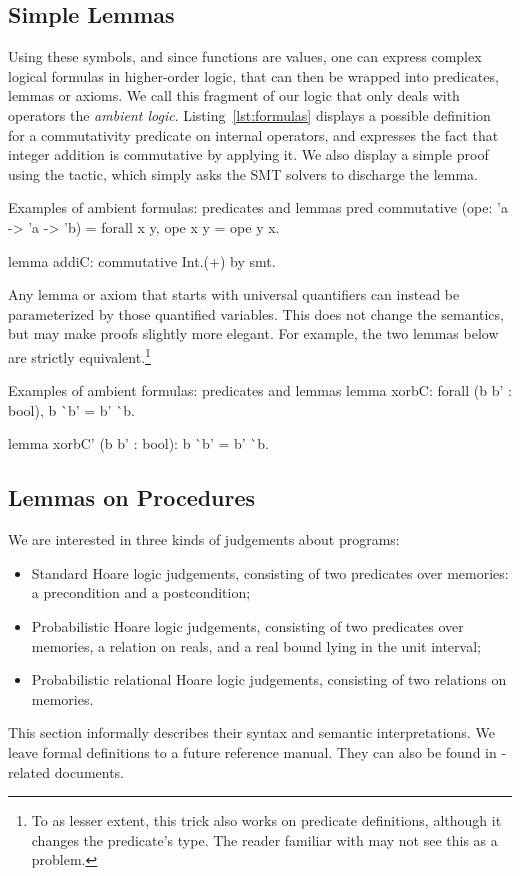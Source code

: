 \subsection{Simple Lemmas\label{sec:ec-specifics}}
Using these symbols, and since functions are values, one can express complex
logical formulas in higher-order logic, that can then be wrapped into
predicates, lemmas or axioms. We call this fragment of our logic that only
deals with operators the \emph{ambient logic}. Listing~\ref{lst:formulas}
displays a possible definition for a commutativity predicate on internal
operators, and expresses the fact that integer addition is commutative by
applying it. We also display a simple proof using the  tactic, which
simply asks the SMT solvers to discharge the lemma.

\begin{easycrypt}[label={lst:formulas}]{Examples of ambient formulas: predicates and lemmas}
pred commutative (ope: 'a -> 'a -> 'b) =
  forall x y, ope x y = ope y x.

lemma addiC: commutative Int.(+) by smt.
\end{easycrypt}

Any lemma or axiom that starts with universal quantifiers can instead be
parameterized by those quantified variables. This does not change the semantics,
but may make proofs slightly more elegant. For example, the two lemmas below
are strictly equivalent.\footnote{To as lesser extent, this trick also works on
predicate definitions, although it changes the predicate's type. The reader
familiar with \Coq may not see this as a problem.}
\begin{easycrypt}[label={lst:formulas}]{Examples of ambient formulas: predicates and lemmas}
lemma xorbC: forall (b b' : bool), b ^^ b' = b' ^^ b.

lemma xorbC' (b b' : bool): b ^^ b' = b' ^^ b.
\end{easycrypt}

\subsection{Lemmas on Procedures}
We are interested in three kinds of judgements about programs:
\begin{itemize}\itemsep-.5em
\item Standard Hoare logic judgements, consisting of two predicates over
  memories: a precondition and a postcondition;
\item Probabilistic Hoare logic judgements, consisting of two predicates over
  memories, a relation on reals, and a real bound lying in the unit interval;
\item Probabilistic relational Hoare logic judgements, consisting of two
  relations on memories.
\end{itemize}
This section informally describes their syntax and semantic interpretations.
We leave formal definitions to a future reference manual. They can also be
found in \CertiCrypt-related documents.

